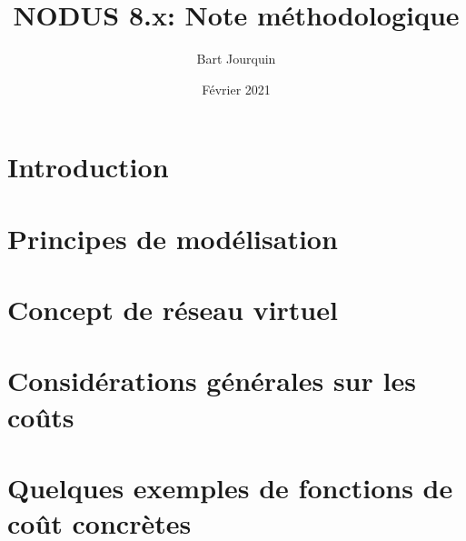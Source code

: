 \documentclass[french,a4paper]{report}
\begin{document}
\title{NODUS 8.x: Note méthodologique}
\author{Bart Jourquin}
\date{Février 2021}
 
\maketitle
\pagestyle{fancyplain}


\setfooter{\thepage}{}{}{}{}{\thepage}

\tableofcontents


%
\setfooter{\thepage}{}{}{}{}{\thepage}%

\chapter{Introduction}


\chapter{Principes de modélisation}


\chapter{Concept de réseau virtuel}


\chapter{Considérations générales sur les coûts}


\chapter{Quelques exemples de fonctions de coût concrètes}

\end{document}
